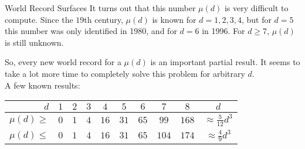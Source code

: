 \begin{surferIntroPage}{World Record Surfaces}
 It turns out that this number $\mu(d)$ is very difficult to compute.
    Since the $19$th century, $\mu(d)$ is known for $d=1,2,3,4$, but for $d=5$
    this number was only identified in 1980, and for $d=6$ in 1996.
    For $d\ge 7$, $\mu(d)$ is still unknown.
  
    So, every new world record for a $\mu(d)$ is an important partial result. It seems to take a lot more time to completely solve this problem for arbitrary $d$.\\  A few known results:
    
   \begin{center}
      \begin{tabular}{r|cccccccc|c}
        $d$ & $1$ & $2$ & $3$ & $4$ & $5$ & $6$ & $7$ & $8$ & $d$\\
        \hline
        \hline
        \rule{0pt}{1.2em}$\mu(d)\ge$ & $0$ & $1$ & $4$ & $16$ & $31$ & $65$ &
        $99$ & $168$ & 
        $\approx \frac{5}{12}d^3$\\[0.3em]
        \hline
        \rule{0pt}{1.2em}$\mu(d)\le$ & $0$ & $1$ & $4$ & $16$ & $31$ & $65$ &
        $104$ & $174$ & $\approx \frac{4}{9}d^3$
      \end{tabular}
    \end{center}
\end{surferIntroPage}
